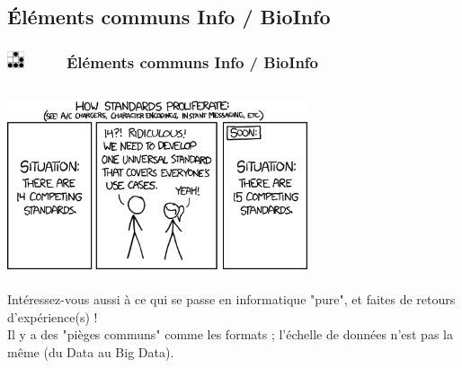 \documentclass[slidetop,11pt]{beamer}
\def\sectionPartVc{{\'E}l{\'e}ments communs Info / BioInfo}
\def\moreInFrameTitle{\includegraphics[height=0.5cm]{img/logo_glider.png}~~~~~}
\begin{document}
\subsection{\sectionPartVc}
\begin{frame}
	\frametitle{\moreInFrameTitle \sectionPartVc}
	\begin{columns}[T]
	\begin{column}[T]{10cm}
		\includegraphics[height=5cm]{img/XKCD_standards.png}~\\~\\
		
		Int{\'e}ressez-vous aussi {\`a} ce qui se passe en informatique "pure", et faites de retours d'exp{\'e}rience(s) !~\\
		Il y a des "pi{\`e}ges communs" comme les formats ; l'{\'e}chelle de donn{\'e}es n'est pas la m{\^e}me (du Data au Big Data). 
	\end{column}
	\end{columns}
\end{frame}
\end{document}
